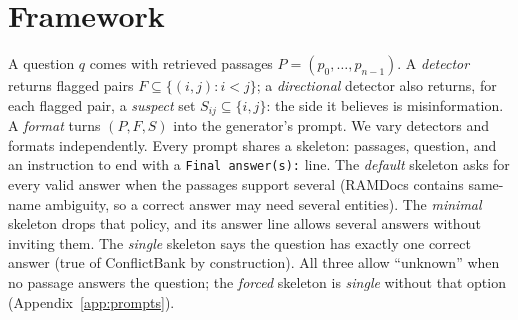 \section{Framework}
\label{sec:method}

A question $q$ comes with retrieved passages $P=(p_0,\dots,p_{n-1})$. A \emph{detector} returns flagged pairs
$F\subseteq\{(i,j): i<j\}$; a \emph{directional} detector also returns, for each flagged pair, a \emph{suspect}
set $S_{ij}\subseteq\{i,j\}$: the side it believes is misinformation. A \emph{format} turns $(P,F,S)$ into the
generator's prompt. We vary detectors and formats independently. Every prompt shares a skeleton: passages, question,
and an instruction to end with a \texttt{Final answer(s):} line. The \emph{default} skeleton asks for every valid
answer when the passages support several (RAMDocs contains same-name ambiguity, so a correct answer may need several
entities). The \emph{minimal} skeleton drops that policy, and its answer line allows several answers without inviting
them. The \emph{single} skeleton says the question has exactly one correct answer (true of ConflictBank by
construction). All three allow ``unknown'' when no passage answers the question; the \emph{forced} skeleton is
\emph{single} without that option (Appendix~\ref{app:prompts}).

